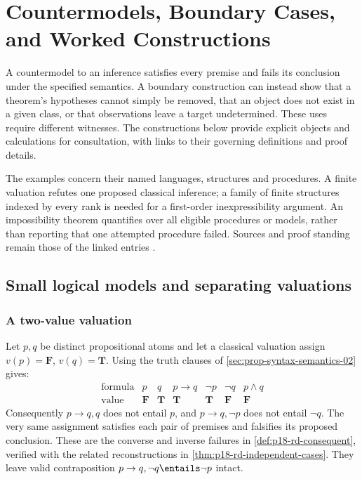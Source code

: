 \chapter{Countermodels, Boundary Cases, and Worked Constructions}
\label{sec:p14-countermodels-and-boundary-cases}

A countermodel to an inference satisfies every premise and fails its
conclusion under the specified semantics. A boundary construction can instead
show that a theorem's hypotheses cannot simply be removed, that an object
does not exist in a given class, or that observations leave a target
undetermined. These uses require different witnesses. The constructions below
provide explicit objects and calculations for consultation, with links to
their governing definitions and proof details.

The examples concern their named languages, structures and procedures. A
finite valuation refutes one proposed classical inference; a family of
finite structures indexed by every rank is needed for a first-order
inexpressibility argument. An impossibility theorem quantifies over all
eligible procedures or models, rather than reporting that one attempted
procedure failed. Sources and proof standing remain those of the linked
entries \cite{Enderton2001,Libkin2004,Kleene1952}.

\section{Small logical models and separating valuations}
\label{sec:p14-counter-small-models}

\subsection{A two-value valuation}
\label{sec:p14-counter-boolean}

Let \(p,q\) be distinct propositional atoms and let a classical valuation
assign \(v(p)=\mathbf F\), \(v(q)=\mathbf T\). Using the truth
clauses of \cref{sec:prop-syntax-semantics-02} gives:
\[
\begin{array}{c|cccccc}
 \text{formula}&p&q&p\to q&\neg p&\neg q&p\land q\\\hline
 \text{value}&\mathbf F&\mathbf T&\mathbf T&\mathbf T&\mathbf F&\mathbf F
\end{array}
\]
Consequently \(p\to q,q\) does not entail \(p\), and
\(p\to q,\neg p\) does not entail \(\neg q\). The very same assignment
satisfies each pair of premises and falsifies its proposed conclusion.
These are the converse and inverse failures in
\cref{def:p18-rd-consequent}, verified with the related reconstructions in
\cref{thm:p18-rd-independent-cases}. They leave valid contraposition
\(p\to q,\neg q\entails\neg p\) intact.

